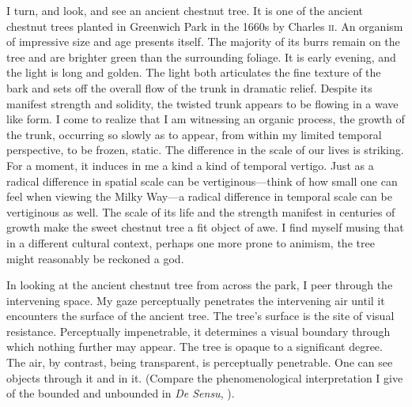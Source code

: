 I turn, and look, and see an ancient chestnut tree. It is one of the ancient chestnut trees planted in Greenwich Park in the 1660s by Charles \textsc{ii}. An organism of impressive size and age presents itself. The majority of its burrs remain on the tree and are brighter green than the surrounding foliage. It is early evening, and the light is long and golden. The light both articulates the fine texture of the bark and sets off the overall flow of the trunk in dramatic relief. Despite its manifest strength and solidity, the twisted trunk appears to be flowing in a wave like form. I come to realize that I am witnessing an organic process, the growth of the trunk, occurring so slowly as to appear, from within my limited temporal perspective, to be frozen, static. The difference in the scale of our lives is striking. For a moment, it induces in me a kind a kind of temporal vertigo.  Just as a radical difference in spatial scale can be vertiginous---think of how small one can feel when viewing the Milky Way---a radical difference in temporal scale can be vertiginous as well. The scale of its life and the strength manifest in centuries of growth make the sweet chestnut tree a fit object of awe. I find myself musing that in a different cultural context, perhaps one more prone to animism, the tree might reasonably be reckoned a god. 

In looking at the ancient chestnut tree from across the park, I peer through the intervening space. My gaze perceptually penetrates the intervening air until it encounters the surface of the ancient tree. The tree's surface is the site of visual resistance. Perceptually impenetrable, it determines a visual boundary through which nothing further may appear. The tree is opaque to a significant degree. The air, by contrast, being transparent, is perceptually penetrable. One can see objects through it and in it. (Compare the phenomenological interpretation I give of the bounded and unbounded in \emph{De Sensu}, \citealt[chapter 3.3]{Kalderon:2015fr}).

